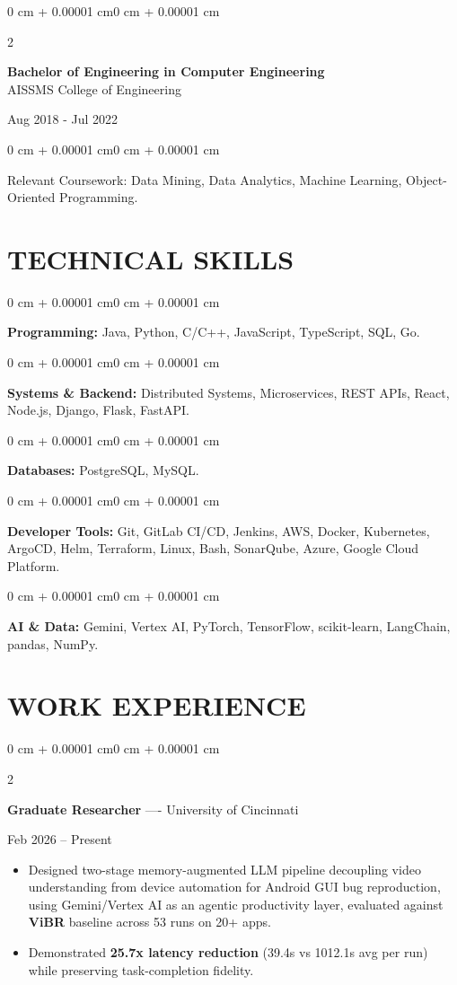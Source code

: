 \documentclass[10pt, letterpaper]{article}
\newenvironment{highlights}{
    \begin{itemize}[
        topsep=0.10 cm,
        parsep=0.06 cm,
        partopsep=0pt,
        itemsep=0.06 cm,
        leftmargin=12pt
    ]
}{
    \end{itemize}
}
\newenvironment{onecolentry}{
    \begin{adjustwidth}{0 cm + 0.00001 cm}{0 cm + 0.00001 cm}
}{
    \end{adjustwidth}
}
\newenvironment{twocolentry}[2][]{
    \onecolentry
    \def\secondColumn{#2}
    \setcolumnwidth{\fill, 4.5 cm}
    \begin{paracol}{2}
}{
    \switchcolumn \raggedleft \secondColumn
    \end{paracol}
    \endonecolentry
}
\begin{document}
\begin{twocolentry}{
    Aug 2018 - Jul 2022
}
    \textbf{Bachelor of Engineering in Computer Engineering} \\
    AISSMS College of Engineering
\end{twocolentry}
\begin{onecolentry}
Relevant Coursework: Data Mining, Data Analytics, Machine Learning, Object-Oriented Programming.
\end{onecolentry}
\section{TECHNICAL SKILLS}
\begin{onecolentry}
\textbf{Programming:} Java, Python, C/C++, JavaScript, TypeScript, SQL, Go.
\end{onecolentry}
\vspace{0.06 cm}
\begin{onecolentry}
\textbf{Systems \& Backend:} Distributed Systems, Microservices, REST APIs, React, Node.js, Django, Flask, FastAPI.
\end{onecolentry}
\vspace{0.06 cm}
\begin{onecolentry}
\textbf{Databases:} PostgreSQL, MySQL.
\end{onecolentry}
\vspace{0.06 cm}
\begin{onecolentry}
\textbf{Developer Tools:} Git, GitLab CI/CD, Jenkins, AWS, Docker, Kubernetes, ArgoCD, Helm, Terraform, Linux, Bash, SonarQube, Azure, Google Cloud Platform.
\end{onecolentry}
\vspace{0.06 cm}
\begin{onecolentry}
\textbf{AI \& Data:} Gemini, Vertex AI, PyTorch, TensorFlow, scikit-learn, LangChain, pandas, NumPy.
\end{onecolentry}

\section{WORK EXPERIENCE}
\begin{twocolentry}{Feb 2026 -- Present}
\textbf{Graduate Researcher} ---- University of Cincinnati
\end{twocolentry}
\begin{highlights}
  \item Designed two-stage memory-augmented LLM pipeline decoupling video understanding from device automation for Android GUI bug reproduction, using Gemini/Vertex AI as an agentic productivity layer, evaluated against \textbf{ViBR} baseline across 53 runs on 20+ apps.
  \item Demonstrated \textbf{25.7x latency reduction} (39.4s vs 1012.1s avg per run) while preserving task-completion fidelity.
\end{highlights}
\end{document}
